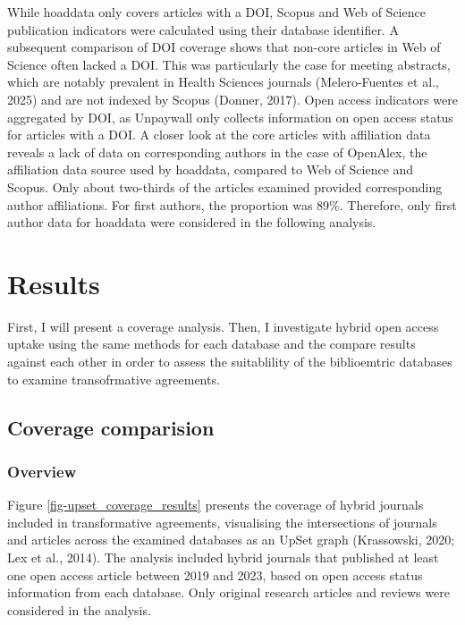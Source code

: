 \documentclass[a4paper,man,floatsintext,longtable,noextraspace,10pt]{apa6}
\begin{document}
While hoaddata only covers articles with a DOI, Scopus and Web of
Science publication indicators were calculated using their database
identifier. A subsequent comparison of DOI coverage shows that non-core
articles in Web of Science often lacked a DOI. This was particularly the
case for meeting abstracts, which are notably prevalent in Health
Sciences journals (Melero-Fuentes et al., 2025) and are not indexed by
Scopus (Donner, 2017). Open access indicators were aggregated by DOI, as
Unpaywall only collects information on open access status for articles
with a DOI. A closer look at the core articles with affiliation data
reveals a lack of data on corresponding authors in the case of OpenAlex,
the affiliation data source used by hoaddata, compared to Web of Science
and Scopus. Only about two-thirds of the articles examined provided
corresponding author affiliations. For first authors, the proportion was
89\%. Therefore, only first author data for hoaddata were considered in
the following analysis.

\section{Results}\label{results}

First, I will present a coverage analysis. Then, I investigate hybrid
open access uptake using the same methods for each database and the
compare results against each other in order to assess the suitablility
of the biblioemtric databases to examine transofrmative agreements.

\subsection{Coverage comparision}\label{coverage-comparision}

\subsubsection{Overview}\label{overview}

Figure \ref{fig-upset_coverage_results} presents the coverage of hybrid
journals included in transformative agreements, visualising the
intersections of journals and articles across the examined databases as
an UpSet graph (Krassowski, 2020; Lex et al., 2014). The analysis
included hybrid journals that published at least one open access article
between 2019 and 2023, based on open access status information from each
database. Only original research articles and reviews were considered in
the analysis.
\end{document}

